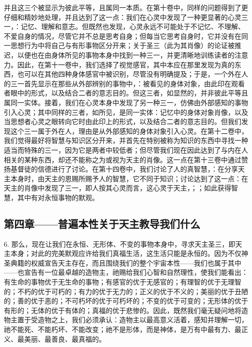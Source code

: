 并且这三个被显示为彼此平等，且属同一本质。在第十卷中，同样的问题得到了更仔细和精妙地处理，并且达到了这一点：我们在心灵中发现了一种更显著的心灵三一，：记忆、理解和意志。但既然也发现，心灵永远不可能处于不记忆、不理解、不爱自身的情况，尽管它并不总是思考自身；但每当它思考自身时，它并没有在同一思想行为中将自己与有形事物区分开来；关于圣三（此为其肖像）的论证被推迟，以便也在由身体所见的事物本身中找到一种三一，并更清晰地训练读者的注意力。因此，在第十一卷中，我们选择了视觉感官，其中本应在那里发现为真的东西，也可以在其他四种身体感官中被识别，尽管没有明确提及；于是，一个外在人的三一首先显示在那些从外部辨别的事物中，：被看见的身体对象，由此印在观看者眼中的形式，以及结合二者的意志目的。但这三者，如显然的，并非彼此平等且属同一实体。接着，我们在心灵本身中发现了另一种三一，仿佛由外部感知的事物引入心灵；其中同样的三者，如所见，是同一实体：记忆中的身体对象肖像，以及当思想者心灵之眼转向它时由此印上的形式，以及结合二者的意志目的。但我们发现这个三一属于外在人，理由是从外部感知的身体对象引入心灵。在第十二卷中，我们觉得最好将智慧与知识区分开来，并首先在特别被称为知识的东西中寻找一种适当而特殊的三一，因为它是两者中较低者；但尽管我们现在因此达到了与内在人相关的某种东西，却还不能称之为或视为天主的肖像。这一点在第十三卷中通过赞扬基督徒的信德进行了讨论。在第十四卷中，我们讨论了人的真智慧，：在分享天主本身时，由天主的恩赐所赐予人的智慧，它不同于知识；讨论达到了这一点：在天主的肖像中发现了三一，即人按其心灵而言，这心灵于天主，；；如此获得智慧，其中有对永恒事物的默观。\par


\subsection{第四章——普遍本性关于天主教导我们什么}

6. 那么，现在让我们在永恒、无形体、不变的事物本身中，寻求天主圣三，即天主本身；对此的完美默观应许给我们真福生活，这生活只能是永恒的。因为不仅神圣典籍的权威宣告天主存在，而且围绕我们的整个宇宙本性——我们也属于其中——也宣告有一位最卓越的造物主，祂赐给我们心智和自然理性，使我们能看出：有生命的事物优于无生命的事物；有感官的优于无感官的；有理智的优于无理智的；不朽的优于可朽的；有力的优于无力的；正义的优于不义的；美丽的优于丑陋的；善的优于恶的；不可朽坏的优于可朽坏的；不变的优于可变的；无形体的优于有形的；无体的优于有体的；真福的优于悲惨的。因此，既然我们毫无疑问地将造物主置于受造物之上，我们必须承认：造物主以最高意义活着，感知并理解一切，祂不能死、不能朽坏、不能改变；祂不是形体，而是神体，是万有中最有力、最正义、最美丽、最善良、最真福的。\par

